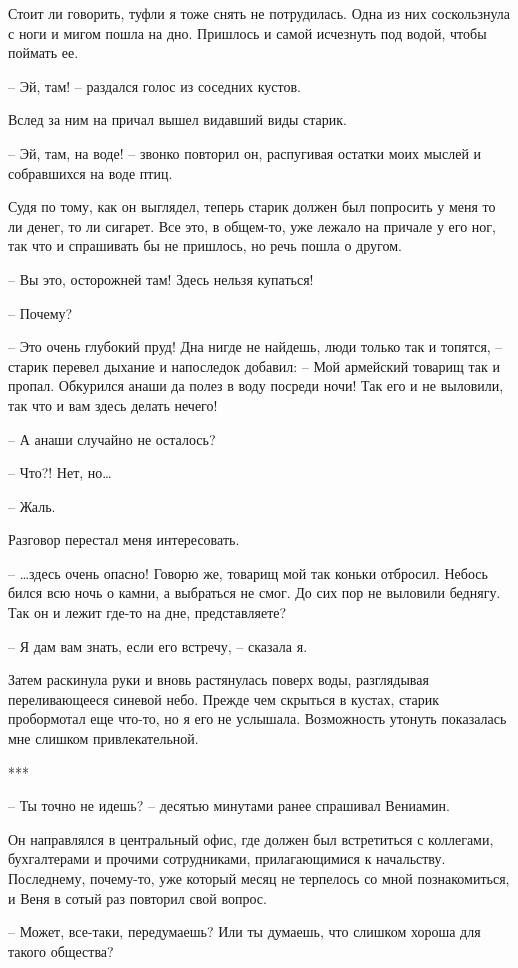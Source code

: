 \documentclass[
]{book}
\begin{document}
Стоит ли говорить, туфли я тоже снять не потрудилась. Одна из них соскользнула с ноги и мигом пошла на дно. Пришлось и самой исчезнуть под водой, чтобы поймать ее.

-- Эй, там! -- раздался голос из соседних кустов.

Вслед за ним на причал вышел видавший виды старик.

-- Эй, там, на воде! -- звонко повторил он, распугивая остатки моих мыслей и собравшихся на воде птиц.

Судя по тому, как он выглядел, теперь старик должен был попросить у меня то ли денег, то ли сигарет. Все это, в общем-то, уже лежало на причале у его ног, так что и спрашивать бы не пришлось, но речь пошла о другом.

-- Вы это, осторожней там! Здесь нельзя купаться!

-- Почему?

-- Это очень глубокий пруд! Дна нигде не найдешь, люди только так и топятся, -- старик перевел дыхание и напоследок добавил: -- Мой армейский товарищ так и пропал. Обкурился анаши да полез в воду посреди ночи! Так его и не выловили, так что и вам здесь делать нечего!

-- А анаши случайно не осталось?

-- Что?! Нет, но\ldots{}

-- Жаль.

Разговор перестал меня интересовать.

-- \ldots здесь очень опасно! Говорю же, товарищ мой так коньки отбросил. Небось бился всю ночь о камни, а выбраться не смог. До сих пор не выловили беднягу. Так он и лежит где-то на дне, представляете?

-- Я дам вам знать, если его встречу, -- сказала я.

Затем раскинула руки и вновь растянулась поверх воды, разглядывая переливающееся синевой небо. Прежде чем скрыться в кустах, старик пробормотал еще что-то, но я его не услышала. Возможность утонуть показалась мне слишком привлекательной.

***

-- Ты точно не идешь? -- десятью минутами ранее спрашивал Вениамин.

Он направлялся в центральный офис, где должен был встретиться с коллегами, бухгалтерами и прочими сотрудниками, прилагающимися к начальству. Последнему, почему-то, уже который месяц не терпелось со мной познакомиться, и Веня в сотый раз повторил свой вопрос.

-- Может, все-таки, передумаешь? Или ты думаешь, что слишком хороша для такого общества?
\end{document}
